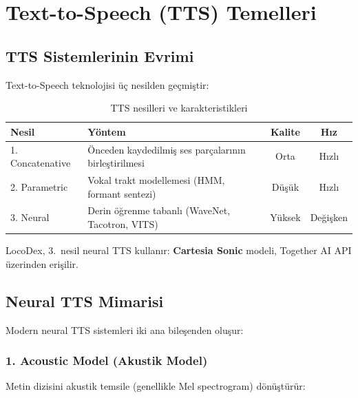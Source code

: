\section{Text-to-Speech (TTS) Temelleri}
\label{sec:tts_basics}

\subsection{TTS Sistemlerinin Evrimi}

Text-to-Speech teknolojisi \"{u}\c{c} nesilden ge\c{c}mi\c{s}tir:

\begin{table}[H]
\centering
\caption{TTS nesilleri ve karakteristikleri}
\label{tab:tts_generations}
\begin{tabularx}{\textwidth}{lXcc}
\toprule
\color{chapterBlue}\textbf{Nesil} & \color{chapterBlue}\textbf{Y\"{o}ntem} & \color{chapterBlue}\textbf{Kalite} & \color{chapterBlue}\textbf{H{\i}z} \\
\midrule
1. Concatenative  & \"{O}nceden kaydedilmi\c{s} ses par\c{c}alar{\i}n{\i}n birle\c{s}tirilmesi & Orta  & H{\i}zl{\i} \\
2. Parametric      & Vokal trakt modellemesi (HMM, formant sentezi)     & D\"{u}\c{s}\"{u}k & H{\i}zl{\i} \\
3. Neural         & Derin \"{o}\u{g}renme tabanlı (WaveNet, Tacotron, VITS)   & Y\"{u}ksek & De\u{g}i\c{s}ken \\
\bottomrule
\end{tabularx}
\end{table}

LocoDex, 3.~nesil neural TTS kullanır: \textbf{Cartesia Sonic} modeli, Together AI API \"{u}zerinden eri\c{s}ilir.

\subsection{Neural TTS Mimarisi}

Modern neural TTS sistemleri iki ana bile\c{s}enden olu\c{s}ur:

\subsubsection{1. Acoustic Model (Akustik Model)}

Metin dizisini akustik temsile (genellikle Mel spectrogram) d\"{o}n\"{u}\c{s}t\"{u}r\"{u}r:

